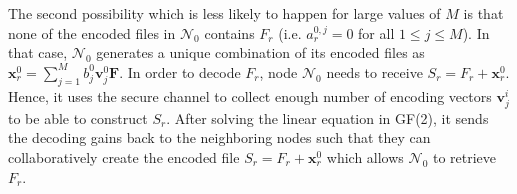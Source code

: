 \documentclass[10pt,journal]{IEEEtran}
\begin{document}
The second possibility which is less likely to happen for large values of $M$ is that none of the encoded files in $\mathcal{N}_0$ contains $F_r$ (i.e. $a_r^{0,j}=0$ for all $1 \le j \le M$). In that case, $\mathcal{N}_0$ generates a unique combination of its encoded files as $\mathbf{x}^0_r=\sum_{j=1}^M b_j^0 \mathbf{v}_j^0 \mathbf{F}$. In order to decode $F_r$, node $\mathcal{N}_0$ needs to receive $S_r = F_r+\mathbf{x}_r^0$. Hence, it uses the secure channel to collect enough number of encoding vectors $\mathbf{v}_j^i$ to be able to construct $S_r$.
After solving the linear equation in GF(2), it  sends the decoding gains back to the neighboring nodes such that they can collaboratively create the encoded file $S_r = F_r+\mathbf{x}_r^0$ which allows $\mathcal{N}_0$ to retrieve $F_r$.
\end{document}
